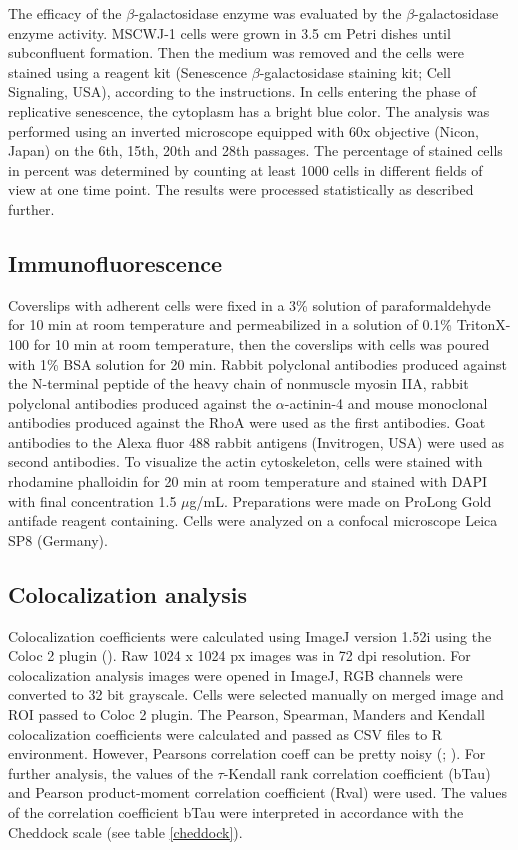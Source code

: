 \documentclass[english,authoryear]{elsarticle}
\begin{document}
The efficacy of the $\beta$-galactosidase enzyme was evaluated by the $\beta$-galactosidase enzyme activity.
MSCWJ-1 cells were grown in 3.5 cm Petri dishes until subconfluent formation.
Then the medium was removed and the cells were stained using a reagent kit (Senescence $\beta$-galactosidase staining kit; Cell Signaling, USA), according to the instructions.
In cells entering the phase of replicative senescence, the cytoplasm has a bright blue color.
The analysis was performed using an inverted microscope equipped with 60x objective (Nicon, Japan) on the 6th, 15th, 20th and 28th passages.
The percentage of stained cells in percent was determined by counting at least 1000 cells in different fields of view at one time point.
The results were processed statistically as described further.

\subsection{Immunofluorescence}

Coverslips with adherent cells were fixed in a 3\% solution of paraformaldehyde for 10 min at room temperature and permeabilized in a solution of 0.1\% TritonX-100 for 10 min at room temperature, then the coverslips with cells was poured with 1\% BSA solution for 20 min.
Rabbit polyclonal antibodies produced against the N-terminal peptide of the heavy chain of nonmuscle myosin IIA, rabbit polyclonal antibodies produced against the $\alpha$-actinin-4 and mouse monoclonal antibodies produced against the RhoA were used as the first antibodies.
Goat antibodies to the Alexa fluor 488 rabbit antigens (Invitrogen, USA) were used as second antibodies.
To visualize the actin cytoskeleton, cells were stained with rhodamine phalloidin for 20 min at room temperature and stained with DAPI with final concentration 1.5 $\mu$g/mL.
Preparations were made on ProLong Gold antifade reagent containing.
Cells were analyzed on a confocal microscope Leica SP8 (Germany).


\subsection{Colocalization analysis}

Colocalization coefficients were calculated using ImageJ version 1.52i using the Coloc 2 plugin (\cite{rueden2017imagej2}).
Raw 1024 x 1024 px images was in 72 dpi resolution.
For colocalization analysis images were opened in ImageJ, RGB channels were converted to 32 bit grayscale.
Cells were selected manually on merged image and ROI passed to Coloc 2 plugin.
The Pearson, Spearman, Manders and Kendall colocalization coefficients were calculated and passed as CSV files to R environment.
However, Pearsons correlation coeff can be pretty noisy (\cite{adler2008replicate}; \cite{bergholm2010analysis}).
For further analysis, the values of the $\tau$-Kendall rank correlation coefficient (bTau) and Pearson product-moment correlation coefficient (Rval) were used.
The values of the correlation coefficient bTau were interpreted in accordance with the Cheddock scale (see table \ref{cheddock}).
\end{document}
